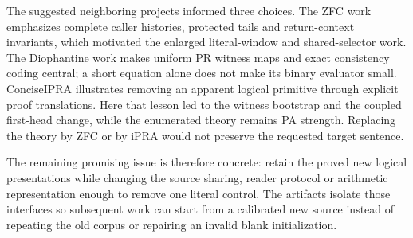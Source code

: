 The suggested neighboring projects \cite{zfc,dio,concise} informed three
choices.  The ZFC work emphasizes complete caller histories, protected
tails and return-context invariants, which motivated the enlarged
literal-window and shared-selector work.  The Diophantine work makes
uniform PR witness maps and exact consistency coding central; a short
equation alone does not make its binary evaluator small.  ConciseIPRA
illustrates removing an apparent logical primitive through explicit
proof translations.  Here that lesson led to the witness bootstrap and
the coupled first-head change, while the enumerated theory remains PA
strength.  Replacing the theory by ZFC or by iPRA would not preserve the
requested target sentence.

The remaining promising issue is therefore concrete: retain the proved
new logical presentations while changing the source sharing, reader
protocol or arithmetic representation enough to remove one literal
control.  The artifacts isolate those interfaces so subsequent work can
start from a calibrated new source instead of repeating the old corpus
or repairing an invalid blank initialization.
